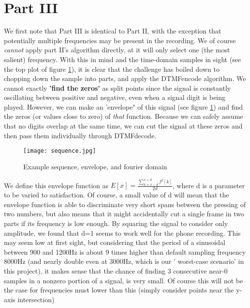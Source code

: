 \documentclass{article}
\begin{document}
\section{Part III}
We first note that Part III is identical to Part II, with the exception that potentially multiple frequencies may be present in the recording. We of course \emph{cannot} apply part II's algorithm directly, at it will only select one (the most salient) frequency.
With this in mind and the time-domain samples in sight (see the top plot of figure \ref{envelopedemonstration}), it is clear that the challenge has boiled down to chopping down the sample into parts, and apply the DTMFencode algorithm.
We cannot exactly \textbf{'find the zeros'} as split points since the signal is constantly oscillating between positive and negative, even when a signal digit is being played. However, we can make an 'envelope" of this signal (see figure \ref{envelopedemonstration}) and find the zeros (or values close to zero) of \emph{that} function. Because we can safely assume that no digits overlap at the same time, we can cut the signal at these zeros and then pass them individually through DTMFdecode.
\begin{figure}[h]
	\texttt{[image: sequence.jpg]}
	\caption{Example sequence, envelope, and fourier domain}
	\label{envelopedemonstration}
\end{figure}

We define this envelope function as $E[x]=\frac{\sum_{k=x-d}^{x+d}f^{2}[k]}{2d}$, where d is a parameter to be varied to satisfaction.
Of course, a small value of d will mean that the envelope function is able to discriminate very short spans between the pressing of two numbers, but also means that it might accidentally cut a single frame in two parts if its frequency is low enough.
By squaring the signal to consider only amplitude, we found that d=1 seems to work well for the phone recording. This may seem low at first sight, but considering that the period of a sinusoidal between 900 and 1200Hz is about 9 times higher than default sampling frequency  8000Hz (and nearly double even at 3000Hz, which is our ' worst-case scenario' in this project), it makes sense that the chance of finding 3 consecutive near-0 samples in a nonzero portion of a signal, is very small. Of course this will not be the case for frequencies must lower than this (simply consider points near the y-axis intersection)
\end{document}
